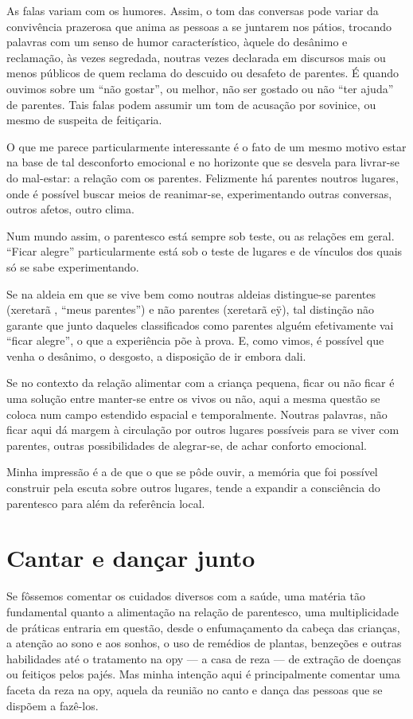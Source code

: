 As falas variam com os humores. Assim, o tom das conversas pode variar
da convivência prazerosa que anima as pessoas a se juntarem nos pátios,
trocando palavras com um senso de humor característico, àquele do
desânimo e reclamação, às vezes segredada, noutras vezes declarada em
discursos mais ou menos públicos de quem reclama do descuido ou
desafeto de parentes. É quando ouvimos sobre um ``não gostar'', ou
melhor, não ser gostado ou não ``ter ajuda'' de parentes. Tais falas
podem assumir um tom de acusação por sovinice, ou mesmo de suspeita de
feitiçaria.

O que me parece particularmente interessante é o fato de um mesmo motivo
estar na base de tal desconforto emocional e no horizonte que se
desvela para livrar-se do mal-estar: a relação com os parentes.
Felizmente há parentes noutros lugares, onde é possível buscar meios de
reanimar-se, experimentando outras conversas, outros afetos, outro
clima. 

Num mundo assim, o parentesco está sempre sob teste, ou as relações em
geral. ``Ficar alegre'' particularmente está sob o teste de lugares e de
vínculos dos quais só se sabe experimentando. 

Se na aldeia em que se vive bem como noutras aldeias distingue-se
parentes (xeretarã , ``meus parentes'') e não parentes (xeretarã eÿ), tal
distinção não garante que junto daqueles classificados como parentes
alguém efetivamente vai ``ficar alegre'', o que a experiência põe à
prova. E, como vimos, é possível que venha o desânimo, o desgosto, a
disposição de ir embora dali.

Se no contexto da relação alimentar com a criança pequena, ficar ou não
ficar é uma solução entre manter-se entre os vivos ou não, aqui a mesma
questão se coloca num campo estendido espacial e temporalmente. Noutras
palavras, não ficar aqui dá margem à circulação por outros lugares
possíveis para se viver com parentes, outras possibilidades de
alegrar-se, de achar conforto emocional. 

Minha impressão é a de que o que se pôde ouvir, a memória que foi
possível construir pela escuta sobre outros lugares, tende a expandir a
consciência do parentesco para além da referência local. 

\section{Cantar e dançar junto}

Se fôssemos comentar os cuidados diversos com a saúde, uma matéria tão
fundamental quanto a alimentação na relação de parentesco, uma
multiplicidade de práticas entraria em questão, desde o enfumaçamento
da cabeça das crianças, a atenção ao sono e aos sonhos, o uso de
remédios de plantas, benzeções e outras habilidades até o tratamento na
opy — a casa de reza — de extração de doenças ou feitiços pelos pajés.
Mas minha intenção aqui é principalmente comentar uma faceta da reza na
opy, aquela da reunião no canto e dança das pessoas que se dispõem a
fazê-los.

